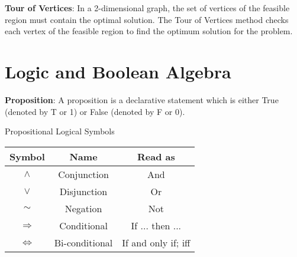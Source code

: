 \begin{defn}\label{mod1:defn:TourOfVertices}
	\textbf{Tour of Vertices}: In a 2-dimensional graph, the set of vertices of the feasible region must contain the optimal solution. The Tour of Vertices method checks each vertex of the feasible region to find the optimum solution for the problem.
\end{defn}

\section{Logic and Boolean Algebra}

\begin{defn}\label{mod1:defn:Proposition}
   \textbf{Proposition}: A proposition is a declarative statement which is either True (denoted by T or 1) or False (denoted by F or 0).
\end{defn}

\begin{defn}\label{mod1:defn:LogicSymbols}
   Propositional Logical Symbols
      
   \begin{table}[ht]
      \centering
      \begin{tabular}{|c|c|c|}
         \hline
            Symbol & Name & Read as\\
         \hline
         $\boldsymbol{\land}$ & Conjunction & And \\
         $\boldsymbol{\lor}$ &   Disjunction & Or \\
         $\boldsymbol{\sim}$ & Negation & Not\\
         $\boldsymbol{\Rightarrow}$ & Conditional & If ... then ...\\
         $\boldsymbol{\Leftrightarrow}$ & Bi-conditional & If and only if; iff\\
         \hline
      \end{tabular}
      \label{mod1:tab:LogicSymbols}
   \end{table}

\end{defn}      

